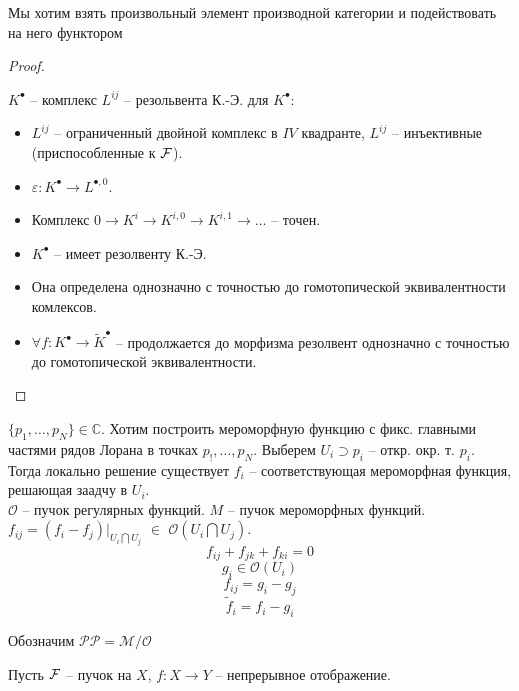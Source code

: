 \documentclass[../main.tex]{subfiles}
\begin{document}
Мы хотим взять произвольный элемент производной категории и подействовать на него функтором 
\begin{proof}
\begin{to_def}
$K^\bullet$ -- комплекс $L^{ij}$ -- резольвента К.-Э. для $K^\bullet$:
\begin{itemize}
    \item $L^{ij}$ -- ограниченный двойной комплекс в $IV$ квадранте, $L^{ij}$ -- инъективные (приспособленные к $\mathcal{F}$).
    \item $\varepsilon\colon K^\bullet \to L^{\bullet, 0}$.
    \item Комплекс $0 \to K^i \to K^{i, 0} \to K^{i, 1}\to \ldots$ -- точен.
\end{itemize}
\end{to_def}
\begin{to_thr}
\begin{itemize}
    \item $K^\bullet$ -- имеет резолвенту К.-Э.
    \item Она определена однозначно с точностью до гомотопической эквивалентности комлексов.
    \item $\forall f\colon K^\bullet \to \tilde{K}^\bullet$ -- продолжается до морфизма резолвент однозначно с точностью до гомотопической эквивалентности. 
\end{itemize}
\end{to_thr}
\end{proof}
\begin{to_suj}
$\lbrace p_1, \ldots, p_N\rbrace \in \mathbb{C}$. Хотим построить мероморфную функцию с фикс. главными частями рядов Лорана в точках $p_!, \ldots, p_N$. Выберем $U_i \supset p_i$ -- откр. окр. т. $p_i$. Тогда локально решение существует $f_i$ -- соответствующая мероморфная функция, решающая заадчу в $U_i$.\\
$\mathcal{O}$ -- пучок регулярных функций. $M$ -- пучок мероморфных функций. $f_{ij} = (f_i - f_j)\vert_{U_i\bigcap U_j}$ $\in$ $\mathcal{O}(U_i\bigcap U_j)$.
\[ f_{ij} + f_{jk} + f_{ki} = 0\]
\[
g_i \in \mathcal{O}(U_i)
\]
\[f_{ij} = g_i - g_j\]
\[\tilde{f}_i = f_i - g_i\]
\end{to_suj}
Обозначим $\mathcal{PP} = \mathcal{M}/\mathcal{O}$
\bee
{}
\eee
Пусть $\mathcal{F}$ -- пучок на $X$, $f\colon X \to Y$ -- непрерывное отображение. 
\end{document}
